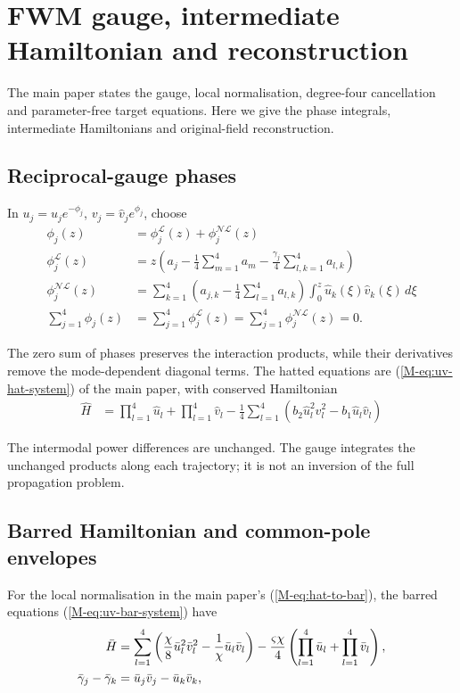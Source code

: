 \documentclass[11pt,a4paper]{article}
\newcommand{\externaleqref}[1]{\textup{(\ref*{#1})}}
\begin{document}


\section{FWM gauge, intermediate Hamiltonian and reconstruction}\label{supp:sec:normalisation}
The main paper states the gauge, local normalisation, degree-four cancellation and parameter-free target equations. Here we give the phase integrals, intermediate Hamiltonians and original-field reconstruction.
\subsection{Reciprocal-gauge phases}
In $u_j=\hat u_j e^{-\phi_j}$, $v_j=\hat v_j e^{\phi_j}$, choose
\begin{align}
\phi_j(z) &= \phi_j^{\mathcal{L}}(z) + \phi_j^{\mathcal{NL}}(z) \\
\phi_j^{\mathcal{L}}(z) &= z\left({a}_{j} - \frac{1}{4}\sum_{m=1}^{4} a_{m} - \frac{{\gamma}_{j}}{4} \sum\limits_{l,k=1}^{4} a_{l,k}\right) \\
\phi_j^{\mathcal{NL}}(z)  &= \sum_{k=1}^{4} \left({a}_{j,k} - \frac{1}{4}\sum_{l=1}^{4} {a}_{l,k}\right) \int_{0}^{z} \hat{u}_k (\xi) \hat{v}_k (\xi) \, d\xi \\
\sum_{j=1}^{4} \phi_j(z) &= \sum_{j=1}^{4} \phi_j^{\mathcal{L}}(z) = \sum_{j=1}^{4} \phi_j^{\mathcal{NL}}(z) =0.
\end{align}

The zero sum of phases preserves the interaction products, while their derivatives remove the mode-dependent diagonal terms. The hatted equations are \externaleqref{M-eq:uv-hat-system} of the main paper, with conserved Hamiltonian
\begin{align}
\hat{H} &= \prod_{l=1}^{4} \hat{u}_l + \prod_{l=1}^{4} \hat{v}_l - \frac{1}{4}\sum_{l=1}^{4} \left(b_2 \hat{u}^{2}_l \hat{v}^{2}_l  - b_1 \hat{u}_l \hat{v}_l \right)
\end{align}

The intermodal power differences are unchanged. The gauge integrates the unchanged products along each trajectory; it is not an inversion of the full propagation problem.

\subsection{Barred Hamiltonian and common-pole envelopes}
For the local normalisation in the main paper's \externaleqref{M-eq:hat-to-bar}, the barred equations \externaleqref{M-eq:uv-bar-system} have
\begin{align}
\bar{H} &= \sum_{l=1}^{4} \left(\frac{\chi}{8} \bar{u}^{2}_l \bar{v}^{2}_l  - \frac{1}{\chi}  \bar{u}_l \bar{v}_l \right) - \frac{\varsigma \chi}{4} \left(\prod_{l=1}^{4} \bar{u}_l + \prod_{l=1}^{4} \bar{v}_l\right), \notag \\
\bar{\gamma}_j - \bar{\gamma}_k &= \bar{u}_j \bar{v}_j - \bar{u}_k \bar{v}_k,
\end{align}
\end{document}
